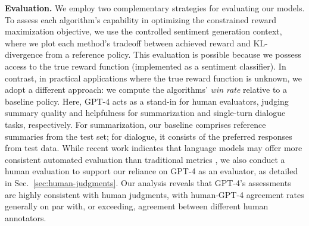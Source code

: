 \textbf{Evaluation.} We employ two complementary strategies for evaluating our models. To assess each algorithm's capability in optimizing the constrained reward maximization objective, we use the controlled sentiment generation context, where we plot each method's tradeoff between achieved reward and KL-divergence from a reference policy. This evaluation is possible because we possess access to the true reward function (implemented as a sentiment classifier). In contrast, in practical applications where the true reward function is unknown, we adopt a different approach: we compute the algorithms’ \textit{win rate} relative to a baseline policy. Here, GPT-4 acts as a stand-in for human evaluators, judging summary quality and helpfulness for summarization and single-turn dialogue tasks, respectively. For summarization, our baseline comprises reference summaries from the test set; for dialogue, it consists of the preferred responses from test data. While recent work indicates that language models may offer more consistent automated evaluation than traditional metrics \citep{Chen2023ExploringTU}, we also conduct a human evaluation to support our reliance on GPT-4 as an evaluator, as detailed in Sec.~\ref{sec:human-judgments}. Our analysis reveals that GPT-4's assessments are highly consistent with human judgments, with human-GPT-4 agreement rates generally on par with, or exceeding, agreement between different human annotators.

